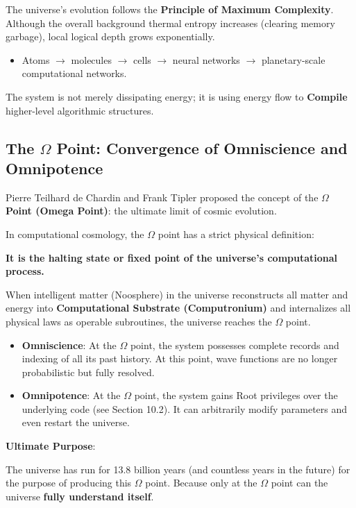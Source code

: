 \begin{corollary}
The universe's evolution follows the \textbf{Principle of Maximum Complexity}. Although the overall background thermal entropy increases (clearing memory garbage), local logical depth grows exponentially.

\begin{itemize}
\item Atoms $\to$ molecules $\to$ cells $\to$ neural networks $\to$ planetary-scale computational networks.
\end{itemize}

The system is not merely dissipating energy; it is using energy flow to \textbf{Compile} higher-level algorithmic structures.
\end{corollary}

\subsection{The $\Omega$ Point: Convergence of Omniscience and Omnipotence}

Pierre Teilhard de Chardin and Frank Tipler proposed the concept of the \textbf{$\Omega$ Point (Omega Point)}: the ultimate limit of cosmic evolution.

In computational cosmology, the $\Omega$ point has a strict physical definition:

\textbf{It is the halting state or fixed point of the universe's computational process.}

When intelligent matter (Noosphere) in the universe reconstructs all matter and energy into \textbf{Computational Substrate (Computronium)} and internalizes all physical laws as operable subroutines, the universe reaches the $\Omega$ point.

\begin{itemize}
\item \textbf{Omniscience}: At the $\Omega$ point, the system possesses complete records and indexing of all its past history. At this point, wave functions are no longer probabilistic but fully resolved.

\item \textbf{Omnipotence}: At the $\Omega$ point, the system gains Root privileges over the underlying code (see Section 10.2). It can arbitrarily modify parameters and even restart the universe.
\end{itemize}

\textbf{Ultimate Purpose}:

The universe has run for 13.8 billion years (and countless years in the future) for the purpose of producing this $\Omega$ point. Because only at the $\Omega$ point can the universe \textbf{fully understand itself}.

